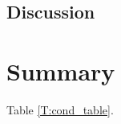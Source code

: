 \documentclass[aps,prb,twocolumn,superscriptaddress,footinbib,amsmath,amssymb,floatfix]{revtex4}
\begin{document}

\subsection{\label{S:Lifetimes}Discussion}

\section{\label{S:Lifetimes}Summary}

Table \ref{T:cond_table}.

\end{document}

